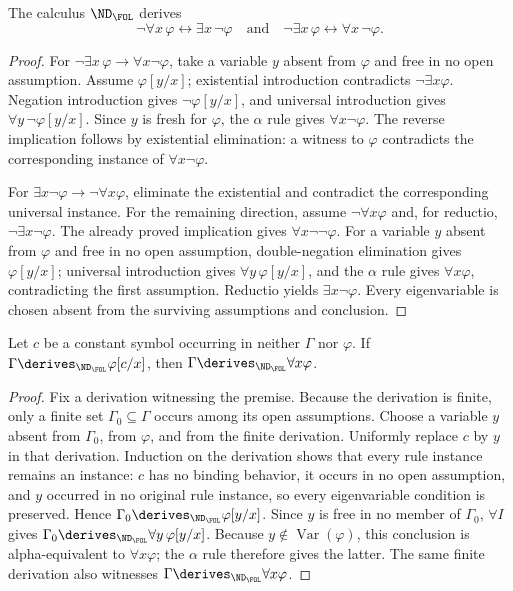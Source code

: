\begin{lemma}
\label{lem:quantifier-duality}
The calculus \(\ND_{\FOL}\) derives
\[
 \neg\forall x\,\varphi\leftrightarrow\exists x\,\neg\varphi
 \quad\text{and}\quad
 \neg\exists x\,\varphi\leftrightarrow\forall x\,\neg\varphi.
\]
\end{lemma}
\begin{proof}
For \(\neg\exists x\,\varphi\to\forall x\neg\varphi\), take a variable
\(y\) absent from \(\varphi\) and free in no open assumption.  Assume \(\varphi[y/x]\); existential
introduction contradicts \(\neg\exists x\varphi\).  Negation introduction
gives \(\neg\varphi[y/x]\), and universal introduction gives
\(\forall y\,\neg\varphi[y/x]\).  Since \(y\) is fresh for \(\varphi\), the
\(\alpha\) rule gives \(\forall x\neg\varphi\).  The reverse
implication follows by existential elimination: a witness to \(\varphi\)
contradicts the corresponding instance of \(\forall x\neg\varphi\).

For \(\exists x\neg\varphi\to\neg\forall x\varphi\), eliminate the
existential and contradict the corresponding universal instance.  For the
remaining direction, assume \(\neg\forall x\varphi\) and, for reductio,
\(\neg\exists x\neg\varphi\).  The already proved implication gives
\(\forall x\neg\neg\varphi\).  For a variable \(y\) absent from
\(\varphi\) and free in no open assumption, double-negation
elimination gives \(\varphi[y/x]\); universal introduction gives
\(\forall y\,\varphi[y/x]\), and the \(\alpha\) rule gives
\(\forall x\varphi\), contradicting the first assumption.  Reductio yields
\(\exists x\neg\varphi\).  Every eigenvariable is chosen absent from the
surviving assumptions and conclusion.
\end{proof}

\begin{lemma}
\label{lem:fresh-constant}
Let \(c\) be a constant symbol occurring in neither \(\Gamma\) nor
\(\varphi\).  If
\(\Gamma\derives_{\ND_{\FOL}}\varphi[c/x]\), then
\(\Gamma\derives_{\ND_{\FOL}}\forall x\varphi\).
\end{lemma}
\begin{proof}
Fix a derivation witnessing the premise.  Because the derivation is finite,
only a finite set \(\Gamma_0\subseteq\Gamma\) occurs among its open
assumptions.  Choose a variable \(y\) absent from \(\Gamma_0\), from
\(\varphi\), and from the finite derivation.  Uniformly replace \(c\) by \(y\)
in that derivation.  Induction on the derivation shows that every rule instance
remains an instance: \(c\) has no binding behavior, it occurs in no open
assumption, and \(y\) occurred in no original rule instance, so every
eigenvariable condition is preserved.  Hence
\(\Gamma_0\derives_{\ND_{\FOL}}\varphi[y/x]\).  Since \(y\) is free in no
member of \(\Gamma_0\), \(\forall I\) gives
\(\Gamma_0\derives_{\ND_{\FOL}}\forall y\,\varphi[y/x]\).  Because
\(y\notin\operatorname{Var}(\varphi)\), this conclusion is alpha-equivalent
to \(\forall x\varphi\); the \(\alpha\) rule therefore gives the latter.  The
same finite derivation also witnesses
\(\Gamma\derives_{\ND_{\FOL}}\forall x\varphi\).
\end{proof}

